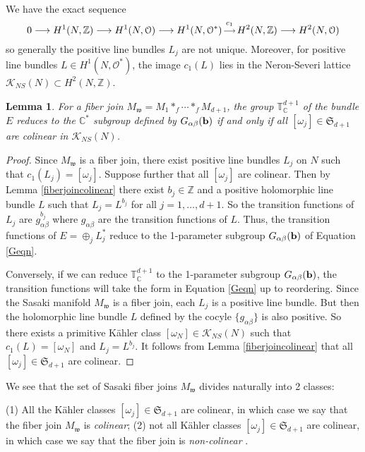 \documentclass[12pt]{amsart}
\newtheorem{lemma}[theorem]{Lemma}
\def\fract#1#2{\raise4pt\hbox{$ #1 \atop #2 $}}
\def\bbc{{\mathbb C}}
\def\bbt{{\mathbb T}}
\def\bbz{{\mathbb Z}}
\def\gra{\alpha}
\def\grb{\beta}
\def\gro{\omega}
\def\bfb{{\bf b}}
\def\calo{{\mathcal O}}
\def\calk{{\mathcal K}}
\def\calo{{\mathcal O}}
\def\gw{{\mathfrak w}}
\def\gS{{\mathfrak S}}
\begin{document}
We have the exact sequence
$$0\longrightarrow H^1(N,\bbz)\longrightarrow H^1(N,\calo)\longrightarrow H^1(N,\calo^*)\fract{c_1}{\longrightarrow} H^2(N,\bbz)\longrightarrow H^2(N,\calo)$$
so generally the positive line bundles $L_j$ are not unique. Moreover, for positive line bundles $L\in H^1(N,\calo^*)$, the image $c_1(L)$ lies in the Neron-Severi lattice $\calk_{NS}(N)\subset H^2(N,\bbz)$. 

\begin{lemma}\label{C*sublem}
For a fiber join $M_\gw=M_1*_f\cdots *_fM_{d+1}$, the group $\bbt^{d+1}_\bbc$ of the bundle $E$ reduces to the $\bbc^*$ subgroup defined by $G_{\gra\grb}(\bfb)$ if and only if all $[\gro_j]\in\gS_{d+1}$ are colinear in $\calk_{NS}(N)$.
\end{lemma}

\begin{proof}
Since $M_\gw$ is a fiber join,  there exist positive line bundles $L_j$ on $N$ such that $c_1(L_j)=[\gro_j]$. Suppose further that all $[\gro_j]$ are colinear. Then by Lemma \ref{fiberjoincolinear} there exist $b_j\in\bbz$ and a positive holomorphic line bundle $L$ such that $L_j=L^{b_j}$ for all $j=1,\ldots,d+1$. So the transition functions of $L_j$ are $g^{b_j}_{\gra\grb}$ where $g_{\gra\grb}$ are the transition functions of $L$. Thus, the transition functions of $E=\oplus_jL^*_j$ reduce to the 1-parameter subgroup $G_{\gra\grb}(\bfb)$ of Equation \eqref{Geqn}.

Conversely, if we can reduce $\bbt^{d+1}_\bbc$ to the 1-parameter subgroup $G_{\gra\grb}(\bfb)$, the transition functions will take the form in Equation \eqref{Geqn} up to reordering. Since the Sasaki manifold $M_\gw$ is a fiber join, each $L_j$ is a positive line bundle. But then the holomorphic line bundle $L$ defined by the cocyle $\{g_{\gra\grb}\}$ is also positive. So there exists a primitive K\"ahler class $[\gro_N]\in\calk_{NS}(N)$ such that $c_1(L)=[\gro_N]$ and $L_j=L^{b_j}$. It follows from Lemma \ref{fiberjoincolinear} that all $[\gro_j]\in\gS_{d+1}$ are colinear.
\end{proof}

We see that the set of Sasaki fiber joins $M_\gw$ divides naturally into 2 classes: 

(1) All the K\"ahler classes $[\gro_j]\in\gS_{d+1}$ are colinear, in which case we say that the fiber join $M_\gw$ is {\it colinear}; 
\newline\indent (2) not all K\"ahler classes $[\gro_j]\in\gS_{d+1}$ are colinear, in which case we say that the fiber join is {\it non-colinear} .
\end{document}
